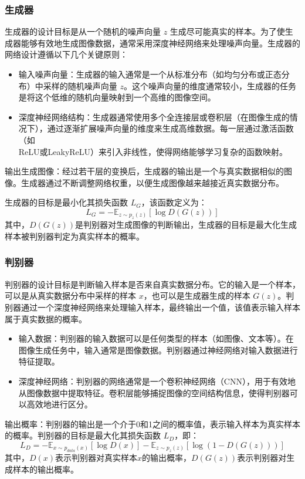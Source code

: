 \documentclass[UTF8]{ctexart}
\begin{document}
\subsubsection{生成器}
生成器的设计目标是从一个随机的噪声向量 $z$ 生成尽可能真实的样本。为了使生成器能够有效地生成图像数据，通常采用深度神经网络来处理噪声向量。生成器的网络设计遵循以下几个关键原则：
\begin{itemize}
\item 输入噪声向量：生成器的输入通常是一个从标准分布（如均匀分布或正态分布）中采样的随机噪声向量 $z$。这个噪声向量的维度通常较小，生成器的任务是将这个低维的随机向量映射到一个高维的图像空间。
\item 深度神经网络结构：生成器通常使用多个全连接层或卷积层（在图像生成的情况下），通过逐渐扩展噪声向量的维度来生成高维数据。每一层通过激活函数（如\\ReLU或LeakyReLU）来引入非线性，使得网络能够学习复杂的函数映射。
\end{itemize} 
输出生成图像：经过若干层的变换后，生成器的输出是一个与真实数据相似的图像。生成器通过不断调整网络权重，以便生成图像越来越接近真实数据分布。

生成器的目标是最小化其损失函数 $L_G$，该函数定义为：
$$L_G = -\mathbb{E}_{z \sim p_z(z)}[\log D(G(z))]$$
其中，$D(G(z))$是判别器对生成图像的判断输出，生成器的目标是最大化生成样本被判别器判定为真实样本的概率。
\subsubsection{判别器}
判别器的设计目标是判断输入样本是否来自真实数据分布。它的输入是一个样本，可以是从真实数据分布中采样的样本 $x$，也可以是生成器生成的样本 $G(z)$。判别器通过一个深度神经网络来处理输入样本，最终输出一个值，该值表示输入样本属于真实数据的概率。
\begin{itemize}
\item 输入数据：判别器的输入数据可以是任何类型的样本（如图像、文本等）。在图像生成任务中，输入通常是图像数据。判别器通过神经网络对输入数据进行特征提取。
\item 深度神经网络：判别器的网络通常是一个卷积神经网络（CNN），用于有效地从图像数据中提取特征。卷积层能够捕捉图像的空间结构信息，使得判别器可以高效地进行区分。
\end{itemize}

输出概率：判别器的输出是一个介于0和1之间的概率值，表示输入样本为真实样本的概率。判别器的目标是最大化其损失函数 $L_D$，即：
$$L_D = -\mathbb{E}_{x \sim p_{data}(x)}[\log D(x)] - \mathbb{E}_{z \sim p_z(z)}[\log (1 - D(G(z)))]$$
其中，$D(x)$表示判别器对真实样本$x$的输出概率，$D(G(z))$表示判别器对生成样本的输出概率。
\end{document}
